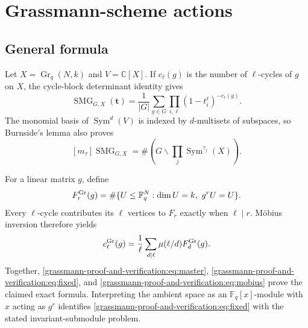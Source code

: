 \documentclass[10pt]{article}
\newcommand{\Sym}{\operatorname{Sym}}
\newcommand{\SMG}{\operatorname{SMG}}
\newcommand{\Gr}{\operatorname{Gr}}
\begin{document}
\clearpage
\section{Grassmann-scheme actions}\label{proof:grassmann}
\begingroup
\providecommand{\Sym}{\operatorname{Sym}}
\renewcommand{\Sym}{\operatorname{Sym}}
\providecommand{\Gr}{\operatorname{Gr}}
\renewcommand{\Gr}{\operatorname{Gr}}
\providecommand{\cS}{\SMG}
\renewcommand{\cS}{\SMG}
\setcounter{theorem}{0}
\setcounter{proposition}{0}
\setcounter{lemma}{0}
\setcounter{corollary}{0}
\setcounter{remark}{0}
\begin{abstract}
For $GL_N(q)$ acting on the $k$-subspaces of $\mathbb F_q^N$, we prove the
permutation Molien formula and verify its invariant-subspace input by direct
prime-field matrix construction.  Three representative cases test points,
hyperplanes, and a nontrivial scalar kernel.
\end{abstract}

\subsection{General formula}
Let $X=\Gr_q(N,k)$ and $V=\mathbb C[X]$.  If $c_\ell(g)$ is the number of
$\ell$-cycles of $g$ on $X$, the cycle-block determinant identity gives
\begin{equation}\label{grassmann-proof-and-verification:eq:master}
\cS_{G,X}(\mathbf t)=\frac1{|G|}\sum_{g\in G}
\prod_{i,\ell}(1-t_i^\ell)^{-c_\ell(g)}.
\end{equation}
The monomial basis of $\Sym^d(V)$ is indexed by $d$-multisets of subspaces,
so Burnside's lemma also proves
\begin{equation}\label{grassmann-proof-and-verification:eq:orbit}
[m_\tau]\cS_{G,X}=\#\left(G\backslash\prod_j\Sym^{\tau_j}(X)\right).
\end{equation}

For a linear matrix $g$, define
\begin{equation}\label{grassmann-proof-and-verification:eq:fixed}
F_r^{\rm Gr}(g)=\#\{U\leq\mathbb F_q^N:\dim U=k,\ g^rU=U\}.
\end{equation}
Every $\ell$-cycle contributes its $\ell$ vertices to $F_r$ exactly when
$\ell\mid r$.  Möbius inversion therefore yields
\begin{equation}\label{grassmann-proof-and-verification:eq:mobius}
c_\ell^{\rm Gr}(g)=\frac1\ell\sum_{d\mid\ell}
\mu(\ell/d)F_d^{\rm Gr}(g).
\end{equation}
Together, \eqref{grassmann-proof-and-verification:eq:master}, \eqref{grassmann-proof-and-verification:eq:fixed}, and \eqref{grassmann-proof-and-verification:eq:mobius} prove the
claimed exact formula.  Interpreting the ambient space as an
$\mathbb F_q[x]$-module with $x$ acting as $g^r$ identifies
\eqref{grassmann-proof-and-verification:eq:fixed} with the stated invariant-submodule problem.
\end{document}
